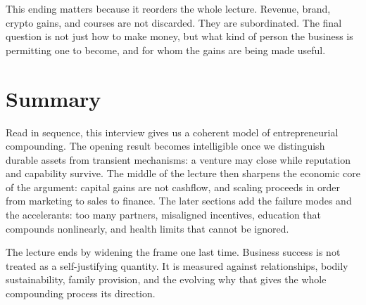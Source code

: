 This ending matters because it reorders the whole lecture. Revenue, brand, crypto gains, and courses are not discarded. They are subordinated. The final question is not just how to make money, but what kind of person the business is permitting one to become, and for whom the gains are being made useful.

\section{Summary}

Read in sequence, this interview gives us a coherent model of entrepreneurial compounding. The opening result becomes intelligible once we distinguish durable assets from transient mechanisms: a venture may close while reputation and capability survive. The middle of the lecture then sharpens the economic core of the argument: capital gains are not cashflow, and scaling proceeds in order from marketing to sales to finance. The later sections add the failure modes and the accelerants: too many partners, misaligned incentives, education that compounds nonlinearly, and health limits that cannot be ignored.

The lecture ends by widening the frame one last time. Business success is not treated as a self-justifying quantity. It is measured against relationships, bodily sustainability, family provision, and the evolving why that gives the whole compounding process its direction.